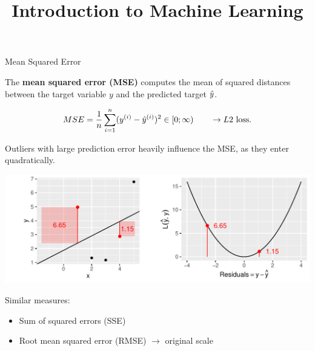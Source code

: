 \documentclass[11pt,compress,t,notes=noshow, xcolor=table]{beamer}
\title{Introduction to Machine Learning}
\institute{\href{https://compstat-lmu.github.io/lecture_i2ml/}{compstat-lmu.github.io/lecture\_i2ml}}
\date{}
\newenvironment{knitrout}{}{} %
\begin{document}







\begin{vbframe}{Mean Squared Error}

The \textbf{mean squared error (MSE)} computes the mean of squared distances 
between the target variable $y$ and the predicted target $\hat{y}$.

$$
MSE = \frac{1}{n} \sum\limits_{i=1}^n (y^{(i)} - \hat{y}^{(i)})^2 \in [0;\infty) \qquad \rightarrow L2 \text{ loss}.
$$

\begin{minipage}[c]{0.33\textwidth}
  \raggedright
  \small
  Outliers with large prediction error heavily influence the MSE, as they 
  enter quadratically.
\end{minipage}%
\begin{minipage}[c]{0.67\textwidth}
  \begin{knitrout}\scriptsize
  \color{fgcolor}
  {\includegraphics[width=\textwidth]{figure/plot_quad_loss}}
\end{knitrout}
\end{minipage}


\small
Similar measures:

\begin{itemize}
  \small
  \item Sum of squared errors (SSE)
  \item Root mean squared error (RMSE) $\rightarrow$ original scale
\end{itemize}

\end{vbframe}
\end{document}
